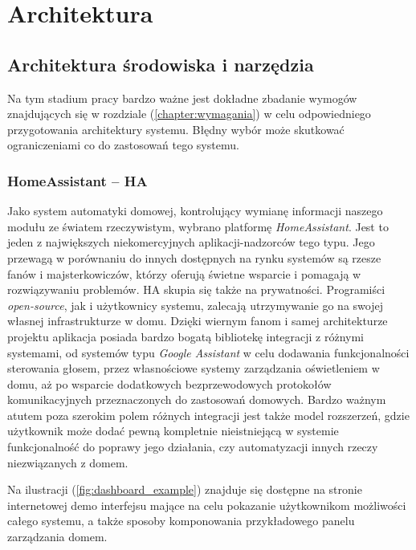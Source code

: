 
\chapter{Architektura}

\section{Architektura środowiska i narzędzia}
Na tym stadium pracy bardzo ważne jest dokładne zbadanie wymogów znajdujących się w rozdziale (\ref{chapter:wymagania}) w celu odpowiedniego przygotowania architektury systemu. Błędny wybór może skutkować ograniczeniami co do zastosowań tego systemu.

\subsection{HomeAssistant -- HA}
Jako system automatyki domowej, kontrolujący wymianę informacji naszego modułu ze światem rzeczywistym, wybrano platformę \textit{HomeAssistant}. Jest to jeden z największych niekomercyjnych aplikacji-nadzorców tego typu. Jego przewagą w porównaniu do innych dostępnych na rynku systemów są rzesze fanów i majsterkowiczów, którzy oferują świetne wsparcie i pomagają w rozwiązywaniu problemów. HA skupia się także na prywatności. Programiści \textit{open-source}, jak i użytkownicy systemu, zalecają utrzymywanie go na swojej własnej infrastrukturze w domu. Dzięki wiernym fanom i samej architekturze projektu aplikacja posiada bardzo bogatą bibliotekę integracji z różnymi systemami, od systemów typu \textit{Google Assistant} w celu dodawania funkcjonalności sterowania głosem, przez własnościowe systemy zarządzania oświetleniem w domu, aż po wsparcie dodatkowych bezprzewodowych protokołów komunikacyjnych przeznaczonych do zastosowań domowych. Bardzo ważnym atutem poza szerokim polem różnych integracji jest także model rozszerzeń, gdzie użytkownik może dodać pewną kompletnie nieistniejącą w systemie funkcjonalność do poprawy jego działania, czy automatyzacji innych rzeczy niezwiązanych z domem.

Na ilustracji (\ref{fig:dashboard_example}) znajduje się dostępne na stronie internetowej demo interfejsu mające na celu pokazanie użytkownikom możliwości całego systemu, a także sposoby komponowania przykładowego panelu zarządzania domem.


